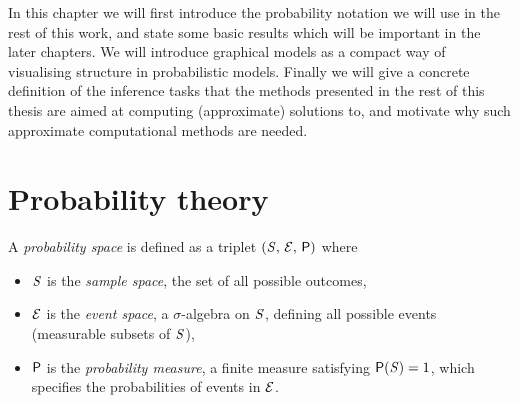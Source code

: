 In this chapter we will first introduce the probability notation we will use in the rest of this work, and state some basic results which will be important in the later chapters. We will introduce graphical models as a compact way of visualising structure in probabilistic models. Finally we will give a concrete definition of the inference tasks that the methods presented in the rest of this thesis are aimed at computing (approximate) solutions to, and motivate why such approximate computational methods are needed.


\section{Probability theory}\label{sec:probability-theory}

A \emph{probability space} is defined as a triplet $(\mathit{S},\,\mathcal{E},\,\mathsf{P})$ where

\begin{itemize}
  \item $\mathit{S}$ is the \emph{sample space}, the set of all possible outcomes,
  \item $\mathcal{E}$ is the \emph{event space}, a $\sigma$-algebra on $\mathit{S}$, defining all possible events (measurable subsets of $\mathit{S}$),
  \item $\mathsf{P}$ is the \emph{probability measure}, a finite measure satisfying $\mathsf{P}(\mathit{S}) = 1$, which specifies the probabilities of events in $\mathcal{E}$.
\end{itemize}


